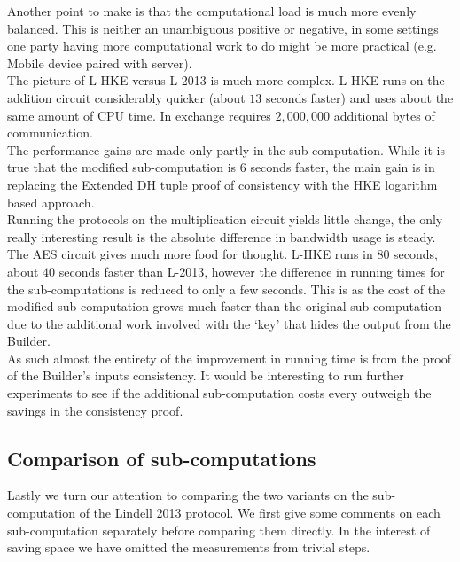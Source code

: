\documentclass[ %
                    author={Nicholas Tutte},
                supervisor={Prof. Nigel Smart},
                    degree={MEng},
                     title={Secure Two Party Computation},
                  subtitle={A practical comparison of recent protocols},
                      type={Research - GG1K},
                      year={2015} ]{dissertation}
\begin{document}
					Another point to make is that the computational load is much more evenly balanced. This is neither an unambiguous positive or negative, in some settings one party having more computational work to do might be more practical (e.g. Mobile device paired with server).\\ 

					The picture of L-HKE versus L-2013 is much more complex. L-HKE runs on the addition circuit considerably quicker (about $13$ seconds faster) and uses about the same amount of CPU time. In exchange requires $2,000,000$ additional bytes of communication.\\

					The performance gains are made only partly in the sub-computation. While it is true that the modified sub-computation is $6$ seconds faster, the main gain is in replacing the Extended DH tuple proof of consistency with the HKE logarithm based approach.\\

					Running the protocols on the multiplication circuit yields little change, the only really interesting result is the absolute difference in bandwidth usage is steady.\\

					The AES circuit gives much more food for thought. L-HKE runs in $80$ seconds, about $40$ seconds faster than L-2013, however the difference in running times for the sub-computations is reduced to only a few seconds. This is as the cost of the modified sub-computation grows much faster than the original sub-computation due to the additional work involved with the `key' that hides the output from the Builder.\\

					As such almost the entirety of the improvement in running time is from the proof of the Builder's inputs consistency. It would be interesting to run further experiments to see if the additional sub-computation costs every outweigh the savings in the consistency proof.

				\subsection{Comparison of sub-computations}
					Lastly we turn our attention to comparing the two variants on the sub-computation of the Lindell 2013 protocol. We first give some comments on each sub-computation separately before comparing them directly. In the interest of saving space we have omitted the measurements from trivial steps.\\
\end{document}
